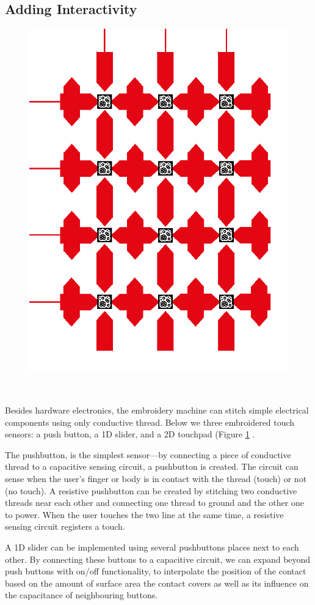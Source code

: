 \documentclass[header.tex]{subfiles}
\begin{document}
\subsection{Adding Interactivity}
\begin{figure}
\centering
  \includegraphics[width=0.6\columnwidth]{figures/RedStickers}
  \caption{}~\label{fig:RedStickers}
  \vspace{-2.5em}
\end{figure}
Besides hardware electronics, the embroidery machine can stitch simple electrical components using only conductive thread. Below we three embroidered touch sensors: a push button, a 1D slider, and a 2D touchpad (Figure \ref{fig:RedStickers} .

The pushbutton, is the simplest sensor---by connecting a piece of conductive thread to a capacitive sensing circuit, a pushbutton is created. The circuit can sense when the user's finger or body is in contact with the thread (touch) or not (no touch). A resistive pushbutton can be created by stitching two conductive threads near each other and connecting one thread to ground and the other one to power. When the user touches the two line at the same time, a resistive sensing circuit registers a touch.

A 1D slider can be implemented using several pushbuttons places next to each other. By connecting these buttons to a capacitive circuit, we can expand beyond push buttons with on/off functionality, to interpolate the position of the contact based on the amount of surface area the contact covers as well as its influence on the capacitance of neighbouring buttons.
\end{document}
